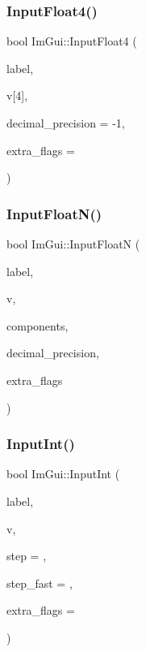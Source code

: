 \hypertarget{namespace_im_gui_a2c9bbb9a99bd8fee134a196fd1ec3dfb}{}\label{namespace_im_gui_a2c9bbb9a99bd8fee134a196fd1ec3dfb} 
\subsubsection{\texorpdfstring{Input\+Float4()}{InputFloat4()}}
{\footnotesize\ttfamily bool Im\+Gui\+::\+Input\+Float4 (\begin{DoxyParamCaption}\item[{const char $\ast$}]{label,  }\item[{float}]{v\mbox{[}4\mbox{]},  }\item[{int}]{decimal\+\_\+precision = {\ttfamily -\/1},  }\item[{Im\+Gui\+Input\+Text\+Flags}]{extra\+\_\+flags = {} }\end{DoxyParamCaption})}

\hypertarget{namespace_im_gui_a7fe2c74d1c0042b77d8e6788faed0983}{}\label{namespace_im_gui_a7fe2c74d1c0042b77d8e6788faed0983} 
\subsubsection{\texorpdfstring{Input\+Float\+N()}{InputFloatN()}}
{\footnotesize\ttfamily bool Im\+Gui\+::\+Input\+FloatN (\begin{DoxyParamCaption}\item[{const char $\ast$}]{label,  }\item[{float $\ast$}]{v,  }\item[{int}]{components,  }\item[{int}]{decimal\+\_\+precision,  }\item[{Im\+Gui\+Input\+Text\+Flags}]{extra\+\_\+flags }\end{DoxyParamCaption})}

\hypertarget{namespace_im_gui_a8b5e9de08c18d6053d2f718b99be94a6}{}\label{namespace_im_gui_a8b5e9de08c18d6053d2f718b99be94a6} 
\subsubsection{\texorpdfstring{Input\+Int()}{InputInt()}}
{\footnotesize\ttfamily bool Im\+Gui\+::\+Input\+Int (\begin{DoxyParamCaption}\item[{const char $\ast$}]{label,  }\item[{int $\ast$}]{v,  }\item[{int}]{step = {},  }\item[{int}]{step\+\_\+fast = {},  }\item[{Im\+Gui\+Input\+Text\+Flags}]{extra\+\_\+flags = {} }\end{DoxyParamCaption})}

